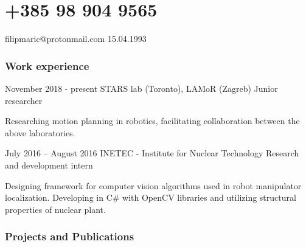 \documentclass{tccv}
\begin{document}
\part
    [hr.linkedin.com/in/filipmrc]
    {+385 98 904 9565}
    {filipmaric@protonmail.com}
    {15.04.1993}
 
    
\section{Work experience}
 

\begin{eventlist}

\item{November 2018 - present}
     {STARS lab (Toronto), LAMoR (Zagreb)}
     {Junior researcher}
     
Researching motion planning in robotics, facilitating collaboration between the above laboratories.
  
\item{July 2016 -- August 2016}    
     {INETEC - Institute for Nuclear Technology}
     {Research and development intern}
     
Designing framework for computer vision algorithms used in robot manipulator localization.
Developing in C\# with OpenCV libraries and utilizing structural properties of nuclear plant.

%       
\end{eventlist}

\section{Projects and Publications}
\end{document}
